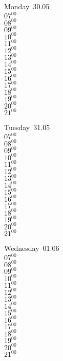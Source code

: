\documentclass[11pt,a4paper]{book}\usepackage[]{graphicx}\usepackage[]{color}
\begin{document}
\begin{headerbox}
\end{headerbox}
\begin{weekdaybox}
  Monday~30.05\\
  { 
  \vfill
  $07^{00}$\\
$08^{00}$\\
$09^{00}$\\
$10^{00}$\\
$11^{00}$\\
$12^{00}$\\
$13^{00}$\\
$14^{00}$\\
$15^{00}$\\
$16^{00}$\\
$17^{00}$\\
$18^{00}$\\
$19^{00}$\\
$20^{00}$\\
$21^{00}$\\
  }
\end{weekdaybox}
\begin{weekdaybox}
  Tuesday~31.05\\
  { 
  \vfill
  $07^{00}$\\
$08^{00}$\\
$09^{00}$\\
$10^{00}$\\
$11^{00}$\\
$12^{00}$\\
$13^{00}$\\
$14^{00}$\\
$15^{00}$\\
$16^{00}$\\
$17^{00}$\\
$18^{00}$\\
$19^{00}$\\
$20^{00}$\\
$21^{00}$\\
  }
\end{weekdaybox}
\begin{weekdaybox}
  Wednesday~01.06\\
  { 
  \vfill
  $07^{00}$\\
$08^{00}$\\
$09^{00}$\\
$10^{00}$\\
$11^{00}$\\
$12^{00}$\\
$13^{00}$\\
$14^{00}$\\
$15^{00}$\\
$16^{00}$\\
$17^{00}$\\
$18^{00}$\\
$19^{00}$\\
$20^{00}$\\
$21^{00}$\\
  }
\end{weekdaybox}
\end{document}
